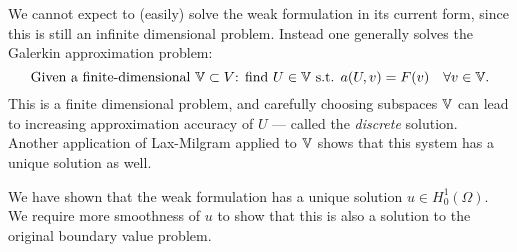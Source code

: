 \documentclass[thesis.tex]{subfiles}
\begin{document}
We cannot expect to (easily) solve the weak formulation in its current form, since this is still an infinite dimensional problem.
Instead one generally solves the Galerkin approximation problem:
\begin{equation}
  \label{eq:galerk_finite}
  \text{Given a finite-dimensional } \mathbb{V} \subset V \text{: find $U \in \mathbb{V}$ s.t. } a(U, v) = F(v) \quad \forall v \in \mathbb{V}.
\end{equation}
This is a finite dimensional problem, and carefully choosing subspaces $\mathbb{V}$ can lead to increasing approximation accuracy of $U$ --- 
called the \emph{discrete} solution. Another application of Lax-Milgram applied to $\mathbb{V}$ shows that this system has a unique solution as well.

\begin{rem}
  We have shown that the weak formulation has a unique solution $u \in H_0^1(\Omega)$. We require more smoothness of $u$ to show that this is also a solution to the original boundary value problem.
\end{rem}
\end{document}
